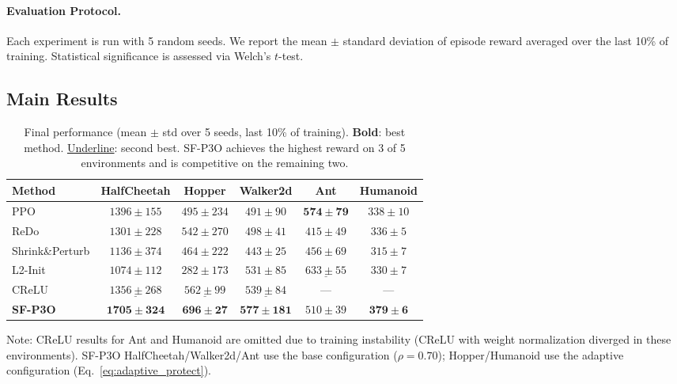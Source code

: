 \documentclass{article}
\begin{document}
\paragraph{Evaluation Protocol.}
Each experiment is run with 5 random seeds. We report the mean $\pm$ standard deviation of episode reward averaged over the last 10\% of training. Statistical significance is assessed via Welch's $t$-test.


\subsection{Main Results}

\begin{table}[t]
\centering
\caption{Final performance (mean $\pm$ std over 5 seeds, last 10\% of training). \textbf{Bold}: best method. \underline{Underline}: second best. SF-P3O achieves the highest reward on 3 of 5 environments and is competitive on the remaining two.}
\label{tab:main_results}
\begin{tabular}{lccccc}
\toprule
\textbf{Method} & \textbf{HalfCheetah} & \textbf{Hopper} & \textbf{Walker2d} & \textbf{Ant} & \textbf{Humanoid} \\
\midrule
PPO              & $1396 \pm 155$ & $495 \pm 234$  & $491 \pm 90$  & $\mathbf{574 \pm 79}$  & $338 \pm 10$ \\
ReDo             & $1301 \pm 228$ & $542 \pm 270$  & $498 \pm 41$  & $415 \pm 49$  & $336 \pm 5$ \\
Shrink\&Perturb  & $1136 \pm 374$ & $464 \pm 222$  & $443 \pm 25$  & $456 \pm 69$  & $315 \pm 7$ \\
L2-Init          & $1074 \pm 112$ & $282 \pm 173$  & $531 \pm 85$  & $\underline{633 \pm 55}$  & $330 \pm 7$ \\
CReLU            & $\underline{1356 \pm 268}$ & $\underline{562 \pm 99}$   & $\underline{539 \pm 84}$  & --- & --- \\
\midrule
\textbf{SF-P3O}  & $\mathbf{1705 \pm 324}$ & $\mathbf{696 \pm 27}$   & $\mathbf{577 \pm 181}$ & $510 \pm 39$  & $\mathbf{379 \pm 6}$ \\
\bottomrule
\end{tabular}
\vspace{0.5em}

{\small Note: CReLU results for Ant and Humanoid are omitted due to training instability (CReLU with weight normalization diverged in these environments). SF-P3O HalfCheetah/Walker2d/Ant use the base configuration ($\rho=0.70$); Hopper/Humanoid use the adaptive configuration (Eq.~\ref{eq:adaptive_protect}).}
\end{table}
\end{document}

